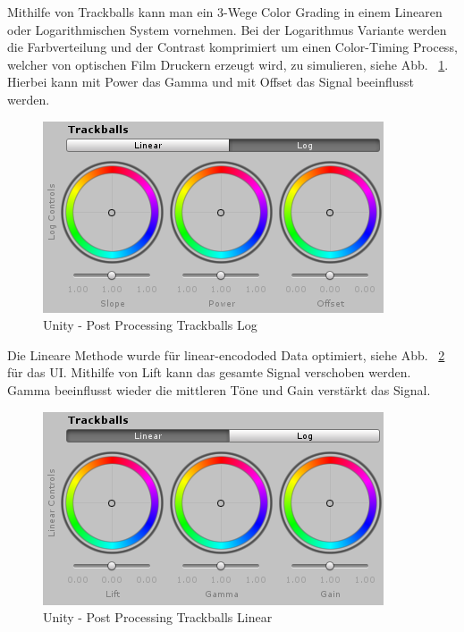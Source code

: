 Mithilfe von Trackballs kann man ein 3-Wege Color Grading in einem Linearen oder Logarithmischen System vornehmen.
Bei der Logarithmus Variante werden die Farbverteilung und der Contrast komprimiert um einen Color-Timing Process, welcher von optischen Film Druckern erzeugt wird, zu simulieren, siehe Abb. ~\ref{fig:unity-post-processing-trackballs-log}.
Hierbei kann mit Power das Gamma und mit Offset das Signal beeinflusst werden.
\begin {figure}
    \centering
    \includegraphics[scale=0.9]{pics/unity-post-processing-trackballs-log}
    \caption{Unity - Post Processing Trackballs Log}
    \label{fig:unity-post-processing-trackballs-log}
\end {figure}
Die Lineare Methode wurde für linear-encododed Data optimiert, siehe Abb. ~\ref{fig:unity-post-processing-trackballs-linear} für das UI.
Mithilfe von Lift kann das gesamte Signal verschoben werden.
Gamma beeinflusst wieder die mittleren Töne und Gain verstärkt das Signal.
\begin {figure}
    \centering
    \includegraphics[scale=0.9]{pics/unity-post-processing-trackballs-linear}
    \caption{Unity - Post Processing Trackballs Linear}
    \label{fig:unity-post-processing-trackballs-linear}
\end {figure}

